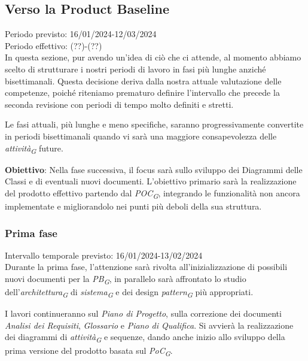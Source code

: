 \subsection{Verso la Product Baseline}
Periodo previsto: 16/01/2024-12/03/2024\\ 
\vspace{0.2cm} 
Periodo effettivo: (??)-(??)\\ 
\vspace{0.2cm} 
In questa sezione, pur avendo un'idea di ciò che ci attende, al momento abbiamo scelto di strutturare i nostri periodi di lavoro in fasi più lunghe anziché bisettimanali. Questa decisione deriva dalla nostra attuale valutazione delle competenze, poiché riteniamo prematuro definire l'intervallo che precede la seconda revisione con periodi di tempo molto definiti e stretti.

Le fasi attuali, più lunghe e meno specifiche, saranno progressivamente convertite in periodi bisettimanali quando vi sarà una maggiore consapevolezza delle \textit{attività}\textsubscript{\textit{G}} future.

\vspace{0.2cm}

\textbf{Obiettivo}: Nella fase successiva, il focus sarà sullo sviluppo dei Diagrammi delle Classi e di eventuali nuovi documenti. L'obiettivo primario sarà la realizzazione del prodotto effettivo partendo dal \textit{POC}\textsubscript{\textit{G}}, integrando le funzionalità non ancora implementate e migliorandolo nei punti più deboli della sua struttura.

\subsubsection{Prima fase}
Intervallo temporale previsto: 16/01/2024-13/02/2024\\ 
\vspace{0.2cm} 
Durante la prima fase, l'attenzione sarà rivolta all'inizializzazione di possibili nuovi documenti per la \textit{PB}\textsubscript{\textit{G}}, in parallelo sarà affrontato lo studio dell'\textit{architettura}\textsubscript{\textit{G}} di \textit{sistema}\textsubscript{\textit{G}} e dei design \textit{pattern}\textsubscript{\textit{G}} più appropriati.

\vspace{0.2cm}

I lavori continueranno sul \textit{Piano di Progetto}, sulla correzione dei documenti \textit{Analisi dei Requisiti}, \textit{Glossario} e \textit{Piano di Qualifica}. Si avvierà la realizzazione dei diagrammi di \textit{attività}\textsubscript{\textit{G}} e sequenze, dando anche inizio allo sviluppo della prima versione del prodotto basata sul \textit{PoC}\textsubscript{\textit{G}}.

